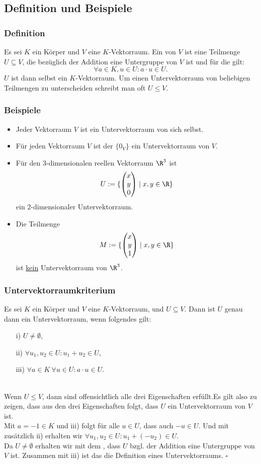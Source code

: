 \subsection{Definition und Beispiele}
%
\begin{frame}\frametitle{Definition}
Es sei $K$ ein Körper und $V$ eine $K$-Vektorraum. Ein  von $V$ ist eine Teilmenge $U \subseteq V$, die bezüglich der Addition eine Untergruppe von $V$ ist und für die gilt:
$$
\forall a \in K, u\in U: a \cdot u \in U.
$$
\pause
$U$ ist dann selbst ein $K$-Vektorraum. Um einen Untervektorraum von beliebigen Teilmengen zu unterscheiden schreibt man oft $U\le V$.
\end{frame}
%
%
\begin{frame}\frametitle{Beispiele}
\begin{itemize}
\item Jeder Vektorraum $V$ ist ein Untervektorraum von sich selbst.\pause
\item Für jeden Vektorraum $V$ ist der  $\{0_V\}$ ein Untervektorraum von $V$.\pause
\item Für den 3-dimensionalen reellen Vektorraum $\R^3$ ist 
$$
U:=\{\begin{pmatrix} x \\ y \\ 0 \end{pmatrix} \mid x,y \in \R\}
$$
ein 2-dimensionaler Untervektorraum.\pause
\item Die Teilmenge
$$
M:=\{\begin{pmatrix} x \\ y \\ 1 \end{pmatrix} \mid x,y \in \R\}
$$\pause
ist \underline{kein} Untervektorraum von $\R^3$.
\end{itemize}
\end{frame}
%
%
\begin{frame}\frametitle{Untervektorraumkriterium}
Es sei $K$ ein Körper und $V$ eine $K$-Vektorraum, und $U \subseteq V$. Dann ist $U$ genau dann ein Untervektorraum, wenn folgendes gilt:
\begin{itemize}
\item[i)] $U \ne \emptyset$,
\item[ii)] $\forall u_1,u_2 \in U: u_1+u_2 \in U$,
\item[iii)] $\forall a \in K\ \forall u \in U: a\cdot u \in U$.
\end{itemize} \pause
{}\\
Wenn $U\le V$, dann sind offensichtlich alle drei Eigenschaften erfüllt.\pause Es gilt also zu zeigen, dass aus den drei Eigenschaften folgt, dass $U$ ein Untervektorraum von $V$ ist.\\\pause
Mit $a=-1\in K$ und iii) folgt für alle $u\in U$, dass auch $-u \in U$. Und mit zusätzlich ii) erhalten wir $\forall u_1,u_2 \in U: u_1+(-u_2)\in U$.\pause \\Da $U\ne \emptyset$ erhalten wir mit dem , dass $U$ bzgl. der Addition eine Untergruppe von $V$ ist. Zusammen mit iii) ist das die Definition eines Untervektorraums. \hfill $\square$
\end{frame}
